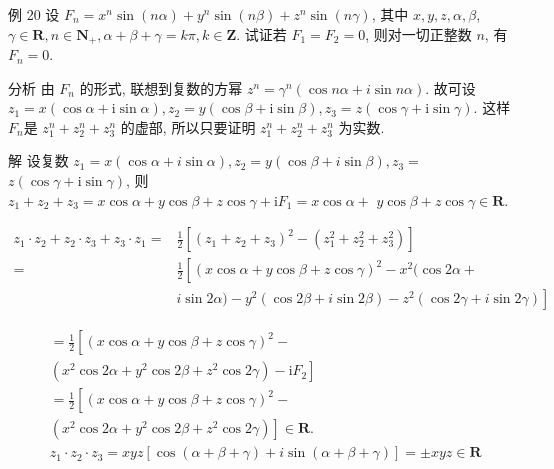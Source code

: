 	例 20 设 $F_{n}=x^{n} \sin (n \alpha)+y^{n} \sin (n \beta)+z^{n} \sin (n \gamma)$, 其中 $x, y, z, \alpha, \beta$, $\gamma \in \mathbf{R}, n \in \mathbf{N}_{+}, \alpha+\beta+\gamma=k \pi, k \in \mathbf{Z}$. 试证若 $F_{1}=F_{2}=0$, 则对一切正整数 $n$, 有 $F_{n}=0$.

	分析 由 $F_{n}$ 的形式, 联想到复数的方幂 $z^{n}=\gamma^{n}(\cos n \alpha+i \sin n \alpha)$. 故可设 $z_{1}=x(\cos \alpha+\mathrm{i} \sin \alpha), z_{2}=y(\cos \beta+\mathrm{i} \sin \beta), z_{3}=z(\cos \gamma+\mathrm{i} \sin \gamma)$. 这样 $F_{n}$是 $z_{1}^{n}+z_{2}^{n}+z_{3}^{n}$ 的虚部, 所以只要证明 $z_{1}^{n}+z_{2}^{n}+z_{3}^{n}$ 为实数.

	解 设复数 $z_{1}=x(\cos \alpha+i \sin \alpha), z_{2}=y(\cos \beta+i \sin \beta), z_{3}=$ $z(\cos \gamma+\mathrm{i} \sin \gamma)$, 则 $z_{1}+z_{2}+z_{3}=x \cos \alpha+y \cos \beta+z \cos \gamma+\mathrm{i} F_{1}=x \cos \alpha+$ $y \cos \beta+z \cos \gamma \in \mathbf{R}$.

	$$
		\begin{aligned}
			z_{1} \cdot z_{2}+z_{2} \cdot z_{3}+z_{3} \cdot z_{1}= & \frac{1}{2}\left[\left(z_{1}+z_{2}+z_{3}\right)^{2}-\left(z_{1}^{2}+z_{2}^{2}+z_{3}^{2}\right)\right] \\
			=                                                      & \frac{1}{2}\left[(x \cos \alpha+y \cos \beta+z \cos \gamma)^{2}-x^{2}(\cos 2 \alpha+\right.           \\
			                                                       & \left.i \sin 2 \alpha)-y^{2}(\cos 2 \beta+i \sin 2 \beta)-z^{2}(\cos 2 \gamma+i \sin 2 \gamma)\right]
		\end{aligned}
	$$

	$$
		\begin{aligned}
			 & =\frac{1}{2}\left[(x \cos \alpha+y \cos \beta+z \cos \gamma)^{2}-\right.                                               \\
			 & \left.\left(x^{2} \cos 2 \alpha+y^{2} \cos 2 \beta+z^{2} \cos 2 \gamma\right)-\mathrm{i} F_{2}\right]                  \\
			 & =\frac{1}{2}\left[(x \cos \alpha+y \cos \beta+z \cos \gamma)^{2}-\right.                                               \\
			 & \left.\left(x^{2} \cos 2 \alpha+y^{2} \cos 2 \beta+z^{2} \cos 2 \gamma\right)\right] \in \mathbf{R} .                  \\
			 & z_{1} \cdot z_{2} \cdot z_{3}=x y z[\cos (\alpha+\beta+\gamma)+i \sin (\alpha+\beta+\gamma)]= \pm x y z \in \mathbf{R}
		\end{aligned}
	$$

